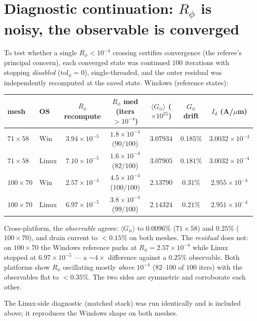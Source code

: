 \documentclass[11pt]{article}
\newcommand{\ten}[1]{\times 10^{#1}}
\begin{document}
\section{Diagnostic continuation: $R_\phi$ is noisy, the observable is converged}\label{sec:diag}
To test whether a single $R_\phi<10^{-4}$ crossing certifies convergence (the referee's principal concern), each converged state was continued $100$ iterations with stopping \emph{disabled} ($\mathrm{tol}_\phi=0$), single-threaded, and the outer residual was independently recomputed at the saved state. Windows (reference states):

\begin{center}\small
\begin{tabular}{l l c c c c c}
\toprule
mesh & OS & $R_\phi$ recompute & $R_\phi$ med (iters $>10^{-4}$) & $\langle G_{ii}\rangle$ ($\ten{25}$) & $G_{ii}$ drift & $I_d$ (A/$\mu$m) \\
\midrule
$71\times58$  & Win   & $3.94\ten{-5}$ & $1.8\ten{-4}$ ($90/100$)  & $3.07934$ & $0.185\%$ & $3.0032\ten{-4}$ \\
$71\times58$  & Linux & $7.10\ten{-5}$ & $1.6\ten{-4}$ ($82/100$)  & $3.07905$ & $0.181\%$ & $3.0032\ten{-4}$ \\
$100\times70$ & Win   & $2.57\ten{-4}$ & $4.5\ten{-4}$ ($100/100$) & $2.13790$ & $0.31\%$  & $2.955\ten{-4}$ \\
$100\times70$ & Linux & $6.97\ten{-5}$ & $3.8\ten{-4}$ ($99/100$)  & $2.14324$ & $0.21\%$  & $2.951\ten{-4}$ \\
\bottomrule
\end{tabular}
\end{center}
Cross-platform, the \emph{observable} agrees: $\langle G_{ii}\rangle$ to $0.0096\%$ ($71\times58$) and $0.25\%$ ($100\times70$), and drain current to $<\!0.15\%$ on both meshes. The \emph{residual} does not: on $100\times70$ the Windows reference parks at $R_\phi=2.57\ten{-4}$ while Linux stopped at $6.97\ten{-5}$ --- a $\sim\!4\times$ difference against a $0.25\%$ observable. Both platforms show $R_\phi$ oscillating mostly \emph{above} $10^{-4}$ ($82$--$100$ of $100$ iters) with the observables flat to $<\!0.35\%$. The two sides are symmetric and corroborate each other.

The Linux-side diagnostic (matched stack) was run identically and is included above; it reproduces the Windows shape on both meshes.
\end{document}
